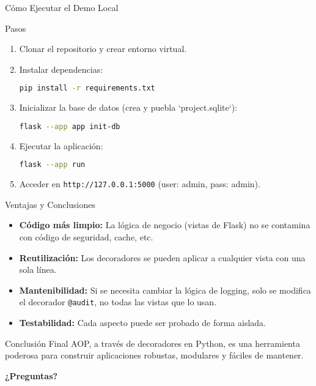 \documentclass[spanish]{beamer}
\begin{document}
\begin{frame}[fragile]{Cómo Ejecutar el Demo Local}
    \begin{block}{Pasos}
    \begin{enumerate}
        \item Clonar el repositorio y crear entorno virtual.
        \item Instalar dependencias:
        \begin{lstlisting}[language=bash]
pip install -r requirements.txt
        \end{lstlisting}
        \item Inicializar la base de datos (crea y puebla `project.sqlite`):
        \begin{lstlisting}[language=bash]
flask --app app init-db
        \end{lstlisting}
        \item Ejecutar la aplicación:
        \begin{lstlisting}[language=bash]
flask --app run
        \end{lstlisting}
        \item Acceder en \texttt{http://127.0.0.1:5000} (user: admin, pass: admin).
    \end{enumerate}
    \end{block}
\end{frame}

\begin{frame}{Ventajas y Conclusiones}
    \begin{itemize}
        \item<1-> \textbf{Código más limpio:} La lógica de negocio (vistas de Flask) no se contamina con código de seguridad, cache, etc.
        \item<2-> \textbf{Reutilización:} Los decoradores se pueden aplicar a cualquier vista con una sola línea.
        \item<3-> \textbf{Mantenibilidad:} Si se necesita cambiar la lógica de logging, solo se modifica el decorador \texttt{@audit}, no todas las vistas que lo usan.
        \item<4-> \textbf{Testabilidad:} Cada aspecto puede ser probado de forma aislada.
    \end{itemize}
    \vfill
    \begin{alertblock}{Conclusión Final}
        AOP, a través de decoradores en Python, es una herramienta poderosa para construir aplicaciones robustas, modulares y fáciles de mantener.
    \end{alertblock}
\end{frame}

\begin{frame}
    \begin{center}
        \Huge\bfseries ¿Preguntas?
    \end{center}
\end{frame}
\end{document}
